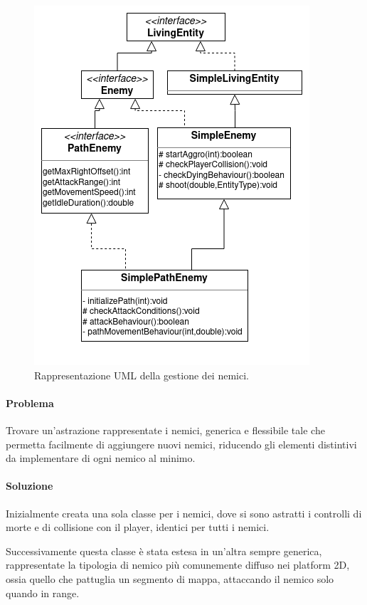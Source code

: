 \documentclass[a4paper,12pt]{report}
\begin{document}
    \begin{figure}[H]
        \centering{}
        \includegraphics[scale=0.7] {img/enemies.png}
        \caption{Rappresentazione UML della gestione dei nemici.}
        \label{img:enemies}
    \end{figure}

    \paragraph{Problema} Trovare un’astrazione rappresentate i nemici, generica e flessibile tale che permetta facilmente di aggiungere nuovi nemici, riducendo gli elementi distintivi da implementare di ogni nemico al minimo.

    \paragraph{Soluzione} Inizialmente creata una sola classe per i nemici, dove si sono astratti i controlli di morte e di collisione con il player, identici per tutti i nemici.

    Successivamente questa classe è stata estesa in un’altra sempre generica, rappresentate la tipologia di nemico più comunemente diffuso nei platform 2D, ossia quello che pattuglia un segmento di mappa, attaccando il nemico solo quando in range.
\end{document}
